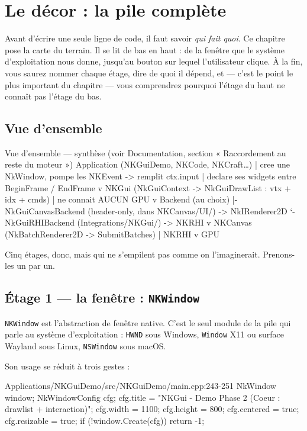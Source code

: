\chapter{Le décor : la pile complète}

Avant d'écrire une seule ligne de code, il faut savoir \emph{qui fait quoi}. Ce
chapitre pose la carte du terrain. Il se lit de bas en haut : de la fenêtre que
le système d'exploitation nous donne, jusqu'au bouton sur lequel l'utilisateur
clique. À la fin, vous saurez nommer chaque étage, dire de quoi il dépend, et —
c'est le point le plus important du chapitre — vous comprendrez pourquoi
l'étage du haut ne connaît pas l'étage du bas.

\section{Vue d'ensemble}

\begin{nkcode}{Vue d'ensemble — synthèse (voir Documentation, section « Raccordement au reste du moteur »)}
   Application  (NKGuiDemo, NKCode, NKCraft…)
        |  cree une NkWindow, pompe les NKEvent -> remplit ctx.input
        |  declare ses widgets entre BeginFrame / EndFrame
        v
   NKGui  (NkGuiContext -> NkGuiDrawList : vtx + idx + cmds)
        |  ne connait AUCUN GPU
        v
   Backend (au choix)
     |- NkGuiCanvasBackend   (header-only, dans NKCanvas/UI/)  -> NkIRenderer2D
     `- NkGuiRHIBackend      (Integrations/NKGui/)             -> NKRHI
        v
   NKCanvas (NkBatchRenderer2D -> SubmitBatches)  |  NKRHI
        v
   GPU
\end{nkcode}

Cinq étages, donc, mais qui ne s'empilent pas comme on l'imaginerait. Prenons-les
un par un.

\section{Étage 1 — la fenêtre : \texttt{NKWindow}}

\texttt{NKWindow} est l'abstraction de fenêtre native. C'est le seul module de la
pile qui parle au système d'exploitation : \texttt{HWND} sous Windows,
\texttt{Window} X11 ou surface Wayland sous Linux, \texttt{NSWindow} sous macOS.

Son usage se réduit à trois gestes :

\begin{nkcode}{Applications/NKGuiDemo/src/NKGuiDemo/main.cpp:243-251}
    NkWindow window;
    NkWindowConfig cfg;
    cfg.title = "NKGui - Demo Phase 2 (Coeur : drawlist + interaction)";
    cfg.width = 1100;
    cfg.height = 800;
    cfg.centered = true;
    cfg.resizable = true;
    if (!window.Create(cfg))
        return -1;
\end{nkcode}

